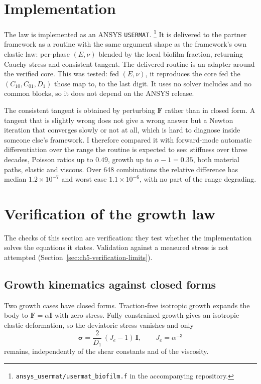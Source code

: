\section{Implementation}
\label{sec:ch5-impl}

The law is implemented as an ANSYS \texttt{USERMAT}.%
\footnote{\texttt{ansys\_usermat/usermat\_biofilm.f} in the accompanying
repository.}
It is delivered to the partner framework as a routine with the same argument
shape as the framework's own elastic law: per-phase $(E,\nu)$ blended by the
local biofilm fraction, returning Cauchy stress and consistent tangent. The
delivered routine is an adapter around the verified core. This was tested:
fed $(E,\nu)$, it reproduces the core fed the
$(C_{10},C_{01},D_1)$ those map to, to the last digit. It uses no solver
includes and no common blocks, so it does not depend on the ANSYS release.

The consistent tangent is obtained by perturbing $\mathbf F$ rather than in
closed form. A tangent that is slightly wrong does not give a wrong answer but
a Newton iteration that converges slowly or not at all, which is hard to
diagnose inside someone else's framework. I therefore compared it with
forward-mode automatic differentiation over the range the routine is expected
to see: stiffness over three decades, Poisson ratios up to $0.49$, growth up to
$\alpha-1=0.35$, both material paths, elastic and viscous. Over 648 combinations
the relative difference has median $1.2\times10^{-7}$ and worst case
$1.1\times10^{-6}$, with no part of the range degrading.

\section{Verification of the growth law}
\label{sec:ch5-verification}

The checks of this section are verification: they test whether the
implementation solves the equations it states. Validation against a measured
stress is not attempted (Section~\ref{sec:ch5-verification-limits}).

\subsection{Growth kinematics against closed forms}
Two growth cases have closed forms. Traction-free isotropic growth expands the
body to $\mathbf F=\alpha\mathbf I$ with zero stress. Fully constrained
growth gives an isotropic elastic deformation, so the deviatoric stress
vanishes and only
\begin{equation}
  \bm\sigma = \frac{2}{D_1}\,(J_e-1)\,\mathbf I,\qquad J_e=\alpha^{-3}
  \label{eq:ch5-constrained}
\end{equation}
remains, independently of the shear constants and of the viscosity.


